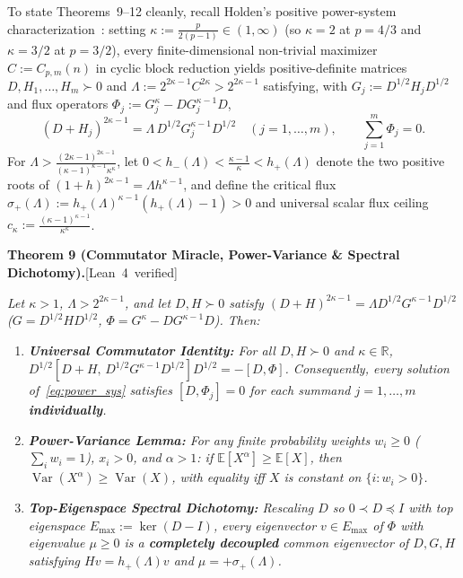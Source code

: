 \documentclass[10pt,letterpaper]{article}
\newcommand{\leanbadge}[1]{\mbox{\sffamily\scriptsize\color{leanborder}[#1]}}
\newcommand{\R}{\mathbb{R}}
\begin{document}
To state Theorems~9--12 cleanly, recall Holden's positive power-system characterization~\cite[\S3]{Holden2026b}: setting $\kappa := \frac{p}{2(p-1)} \in (1, \infty)$ (so $\kappa = 2$ at $p = 4/3$ and $\kappa = 3/2$ at $p = 3/2$), every finite-dimensional non-trivial maximizer $C := C_{p,m}(n)$ in cyclic block reduction yields positive-definite matrices $D, H_1,\dots,H_m \succ 0$ and $\Lambda := 2^{2\kappa - 1} C^{2\kappa} > 2^{2\kappa - 1}$ satisfying, with $G_j := D^{1/2} H_j D^{1/2}$ and flux operators $\Phi_j := G_j^\kappa - D G_j^{\kappa - 1} D$,
\begin{equation}\label{eq:power_sys}
  (D + H_j)^{2\kappa - 1} = \Lambda\, D^{1/2} G_j^{\kappa - 1} D^{1/2} \quad (j = 1,\dots,m),
  \qquad \sum_{j=1}^m \Phi_j = 0.
\end{equation}
For $\Lambda > \frac{(2\kappa-1)^{2\kappa-1}}{(\kappa-1)^{\kappa-1}\kappa^\kappa}$, let $0 < h_-(\Lambda) < \frac{\kappa-1}{\kappa} < h_+(\Lambda)$ denote the two positive roots of $(1+h)^{2\kappa-1} = \Lambda h^{\kappa-1}$, and define the critical flux $\sigma_+(\Lambda) := h_+(\Lambda)^{\kappa-1}(h_+(\Lambda) - 1) > 0$ and universal scalar flux ceiling $c_\kappa := \frac{(\kappa-1)^{\kappa-1}}{\kappa^\kappa}$.

\begin{tcolorbox}[mathbox]
\textbf{Theorem 9 (Commutator Miracle, Power-Variance \& Spectral Dichotomy).}\hfill\leanbadge{Lean~4 verified}\par\vspace{1.5pt}
\emph{Let $\kappa > 1$, $\Lambda > 2^{2\kappa-1}$, and let $D, H \succ 0$ satisfy $(D+H)^{2\kappa-1} = \Lambda D^{1/2} G^{\kappa-1} D^{1/2}$ ($G = D^{1/2} H D^{1/2}$, $\Phi = G^\kappa - D G^{\kappa-1} D$). Then:}
\begin{enumerate}[label=(\alph*),leftmargin=1.8em,itemsep=2pt,topsep=2pt]
  \item \emph{\textbf{Universal Commutator Identity:} For all $D, H \succ 0$ and $\kappa \in \R$, $D^{1/2}[D+H,\, D^{1/2}G^{\kappa-1}D^{1/2}]D^{1/2} = -[D, \Phi]$. Consequently, every solution of~\eqref{eq:power_sys} satisfies $[D, \Phi_j] = 0$ for each summand $j = 1,\dots,m$ \textbf{individually}.}
  \item \emph{\textbf{Power-Variance Lemma:} For any finite probability weights $w_i \ge 0$ ($\sum_i w_i = 1$), $x_i > 0$, and $\alpha > 1$: if $\mathbb{E}[X^\alpha] \ge \mathbb{E}[X]$, then $\operatorname{Var}(X^\alpha) \ge \operatorname{Var}(X)$, with equality iff $X$ is constant on $\{i : w_i > 0\}$.}
  \item \emph{\textbf{Top-Eigenspace Spectral Dichotomy:} Rescaling $D$ so $0 \prec D \preceq I$ with top eigenspace $E_{\max} := \ker(D - I)$, every eigenvector $v \in E_{\max}$ of $\Phi$ with eigenvalue $\mu \ge 0$ is a \textbf{completely decoupled} common eigenvector of $D, G, H$ satisfying $Hv = h_+(\Lambda) v$ and $\mu = +\sigma_+(\Lambda)$.}
\end{enumerate}
\end{tcolorbox}
\end{document}
